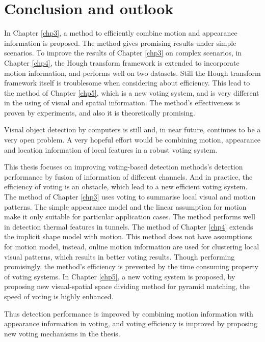 \chapter{Conclusion and outlook}
\label{chp6}

In Chapter \ref{chp3}, a method to efficiently combine motion and appearance information is proposed. The method gives promising results under simple scenarios. To improve the results of Chapter \ref{chp3} on complex scenarios, in Chapter \ref{chp4}, the Hough transform framework is extended to incorporate motion information, and performs well on two datasets. Still the Hough transform framework itself is troublesome when considering about efficiency. This lead to the method of Chapter \ref{chp5}, which is a new voting system, and is very different in the using of visual and spatial information. The method's effectiveness is proven by experiments, and also it is theoretically promising.

Visual object detection by computers is still and, in near future, continues to be a very open problem. A very hopeful effort would be combining motion, appearance and location information of local features in a robust voting system.

This thesis focuses on improving voting-based detection methods's detection performance by fusion of information of different channels. And in practice, the efficiency of voting is an obstacle, which lead to a new efficient voting system. The method of Chapter \ref{chp3} uses voting to summarise local visual and motion patterns. The simple appearance model and the linear assumption for motion make it only suitable for particular application cases. The method performs well in detection thermal features in tunnels. The method of Chapter \ref{chp4} extends the implicit shape model with motion. This method does not have assumptions for motion model, instead, online motion information are used for clustering local visual patterns, which results in better voting results. Though performing promisingly, the method's efficiency is prevented by the time consuming property of voting systems. In Chapter \ref{chp5}, a new voting system is proposed, by proposing new visual-spatial space dividing method for pyramid matching, the speed of voting is highly enhanced. 

Thus detection performance is improved by combining motion information with appearance information in voting, and voting efficiency is improved by proposing new voting mechanisms in the thesis.

